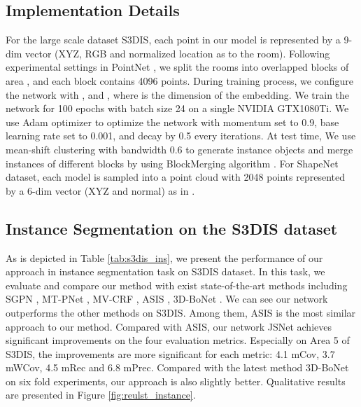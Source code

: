 \documentclass[letterpaper]{article} \usepackage{aaai20}  \usepackage{times}  \usepackage{helvet} \usepackage{courier}  \usepackage[hyphens]{url}  \usepackage{graphicx} \urlstyle{rm} \def\UrlFont{\rm}  \usepackage{graphicx}  \frenchspacing  \setlength{\pdfpagewidth}{8.5in}  \setlength{\pdfpageheight}{11in}
\begin{document}
\subsection{Implementation Details}\label{sec:experiments-implement}
For the large scale dataset S3DIS, each point in our model is represented by a 9-dim vector (XYZ, RGB and normalized location as to the room). Following experimental settings in PointNet \cite{qi2016pointnet}, we split the rooms into overlapped blocks of area , and each block contains 4096 points. During training process, we configure the network with ,  and , where  is the dimension of the embedding. We train the network for 100 epochs with batch size 24 on a single NVIDIA GTX1080Ti. We use Adam optimizer to optimize the network with momentum set to 0.9, base learning rate set to 0.001, and decay by 0.5 every  iterations. At test time, We use mean-shift clustering with bandwidth 0.6 to generate instance objects and merge instances of different blocks by using BlockMerging algorithm \cite{Wang_2018_CVPR}. For ShapeNet dataset, each model is sampled into a point cloud with 2048 points represented by a 6-dim vector (XYZ and normal) as in \cite{qi2017pointnet++}.

\subsection{Instance Segmentation on the S3DIS dataset}
As is depicted in Table \ref{tab:s3dis_ins}, we present the performance of our approach in instance segmentation task on S3DIS dataset. In this task, we evaluate and compare our method with exist state-of-the-art methods including SGPN \cite{Wang_2018_CVPR}, MT-PNet \cite{Pham_2019_CVPR}, MV-CRF \cite{Pham_2019_CVPR}, ASIS \cite{Wang_2019_CVPR}, 3D-BoNet \cite{yang2019learning}. We can see our network outperforms the other methods on S3DIS. Among them, ASIS is the most similar approach to our method. Compared with ASIS, our network JSNet achieves significant improvements on the four evaluation metrics. Especially on Area 5 of S3DIS, the improvements are more significant for each metric: 4.1 mCov, 3.7 mWCov, 4.5 mRec and 6.8 mPrec. Compared with the latest method 3D-BoNet on six fold experiments, our approach is also slightly better. Qualitative results are presented in Figure \ref{fig:reulst_instance}.
\end{document}
